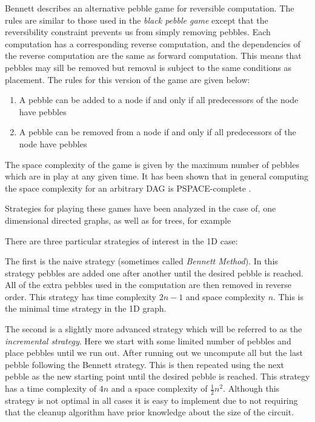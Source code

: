 Bennett\cite{Bennett:89} describes an alternative pebble game for reversible
computation. The rules are similar to those used in the \emph{black pebble
game} except that the reversibility constraint prevents us from simply removing
pebbles. Each computation has a corresponding reverse computation, and the
dependencies of the reverse computation are the same as forward computation.
This means that pebbles may sill be removed but removal is subject to the same
conditions as placement. The rules for this version of the game are given below:

\begin{enumerate}

  \item A pebble can be added to a node if and only if all predecessors of the
    node have pebbles

  \item A pebble can be removed from a node if and only if all predecessors of
    the node have pebbles

\end{enumerate}

The space complexity of the game is given by the maximum number of pebbles which
are in play at any given time. It has been shown that in general computing the
space complexity for an arbitrary DAG is PSPACE-complete \cite{chan13}.

Strategies for playing these games have been analyzed in the case of, one
dimensional directed graphs, as well as for trees\cite{peb16}, for example

There are three particular strategies of interest in the 1D case:

The first is the naive strategy (sometimes called \emph{Bennett Method}). In
this strategy pebbles are added one after another until the desired pebble is reached.
All of the extra pebbles used in the computation are then removed in reverse
order. This strategy has time complexity $2n-1$ and space complexity
$n$.  This is the minimal time strategy in the 1D graph.

The second is a slightly more advanced strategy which will be referred to as the
\emph{incremental strategy}. Here we start with some limited number of pebbles
and place pebbles until we run out. After running out we uncompute all but the
last pebble following the Bennett strategy. This is then repeated using the next
pebble as the new starting point until the desired pebble is reached. This
strategy has a time complexity of $4n$ and a space complexity of
$\frac{1}{2}n^2$. Although this strategy is not optimal in all cases it is easy
to implement due to not requiring that the cleanup algorithm have prior
knowledge about the size of the circuit.

